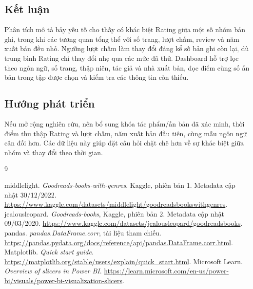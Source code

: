 \documentclass[11pt,a4paper]{article}
\begin{document}

\subsection{Kết luận}
Phân tích mô tả bảy yếu tố cho thấy có khác biệt Rating giữa một số nhóm bản ghi, trong khi các tương quan tổng thể với số trang, lượt chấm, review và năm xuất bản đều nhỏ. Ngưỡng lượt chấm làm thay đổi đáng kể số bản ghi còn lại, dù trung bình Rating chỉ thay đổi nhẹ qua các mức đã thử. Dashboard hỗ trợ lọc theo ngôn ngữ, số trang, thập niên, tác giả và nhà xuất bản, đọc điểm cùng số ấn bản trong tập được chọn và kiểm tra các thông tin còn thiếu.

\subsection{Hướng phát triển}
Nếu mở rộng nghiên cứu, nên bổ sung khóa tác phẩm/ấn bản đã xác minh, thời điểm thu thập Rating và lượt chấm, năm xuất bản đầu tiên, cùng mẫu ngôn ngữ cân đối hơn. Các dữ liệu này giúp đặt câu hỏi chặt chẽ hơn về sự khác biệt giữa nhóm và thay đổi theo thời gian.

\clearpage
\begin{thebibliography}{9}
 middlelight. \textit{Goodreads-books-with-genres}, Kaggle, phiên bản 1. Metadata cập nhật 30/12/2022. \url{https://www.kaggle.com/datasets/middlelight/goodreadsbookswithgenres}.
 jealousleopard. \textit{Goodreads-books}, Kaggle, phiên bản 2. Metadata cập nhật 09/03/2020. \url{https://www.kaggle.com/datasets/jealousleopard/goodreadsbooks}.
 pandas. \textit{pandas.DataFrame.corr}, tài liệu tham chiếu. \url{https://pandas.pydata.org/docs/reference/api/pandas.DataFrame.corr.html}.
 Matplotlib. \textit{Quick start guide}. \url{https://matplotlib.org/stable/users/explain/quick_start.html}.
 Microsoft Learn. \textit{Overview of slicers in Power BI}. \url{https://learn.microsoft.com/en-us/power-bi/visuals/power-bi-visualization-slicers}.
\end{thebibliography}
\end{document}
